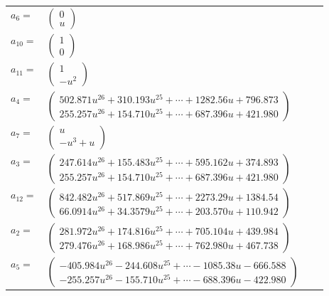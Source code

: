 \documentclass[1p]{elsarticle_modified}
\theoremstyle{definition}
\begin{document}
\begin{tabular}{m{7pt} m{180pt} m{7pt} m{180pt} }
\flushright $a_{6}=$&$\begin{pmatrix}0\\u\end{pmatrix}$ \\
\flushright $a_{10}=$&$\begin{pmatrix}1\\0\end{pmatrix}$ \\
\flushright $a_{11}=$&$\begin{pmatrix}1\\- u^2\end{pmatrix}$ \\
\flushright $a_{4}=$&$\begin{pmatrix}502.871 u^{26}+310.193 u^{25}+\cdots+1282.56 u+796.873\\255.257 u^{26}+154.710 u^{25}+\cdots+687.396 u+421.980\end{pmatrix}$ \\
\flushright $a_{7}=$&$\begin{pmatrix}u\\- u^3+u\end{pmatrix}$ \\
\flushright $a_{3}=$&$\begin{pmatrix}247.614 u^{26}+155.483 u^{25}+\cdots+595.162 u+374.893\\255.257 u^{26}+154.710 u^{25}+\cdots+687.396 u+421.980\end{pmatrix}$ \\
\flushright $a_{12}=$&$\begin{pmatrix}842.482 u^{26}+517.869 u^{25}+\cdots+2273.29 u+1384.54\\66.0914 u^{26}+34.3579 u^{25}+\cdots+203.570 u+110.942\end{pmatrix}$ \\
\flushright $a_{2}=$&$\begin{pmatrix}281.972 u^{26}+174.816 u^{25}+\cdots+705.104 u+439.984\\279.476 u^{26}+168.986 u^{25}+\cdots+762.980 u+467.738\end{pmatrix}$ \\
\flushright $a_{5}=$&$\begin{pmatrix}-405.984 u^{26}-244.608 u^{25}+\cdots-1085.38 u-666.588\\-255.257 u^{26}-155.710 u^{25}+\cdots-688.396 u-422.980\end{pmatrix}$ \\

\end{tabular}
\end{document}
